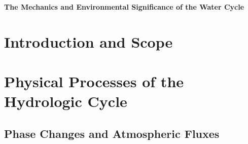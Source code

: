 \documentclass[11.5pt]{article}
\begin{document}
\begin{center}
{\LARGE\bfseries\color{accent} The Mechanics and Environmental Significance of the Water Cycle}\\[6pt]
\end{center}
\vspace{6pt}
\section{Introduction and Scope}
\section{Physical Processes of the Hydrologic Cycle}
\subsection{Phase Changes and Atmospheric Fluxes}
\end{document}
